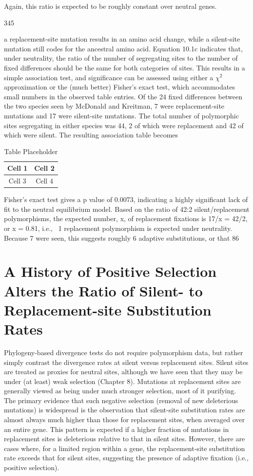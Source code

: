 \documentclass{article}
\begin{document}
Again, this ratio is expected to be roughly constant over neutral genes.

345

a replacement-site mutation results in an amino acid change, while a silent-site mutation still codes for the ancestral amino acid. Equation 10.1c indicates that, under neutrality, the ratio of the number of segregating sites to the number of fixed differences should be the same for both categories of sites. This results in a simple association test, and significance can be assessed using either a  $ \chi^{2} $ approximation or the (much better) Fisher's exact test, which accommodates small numbers in the observed table entries. Of the 24 fixed differences between the two species seen by McDonald and Kreitman, 7 were replacement-site mutations and 17 were silent-site mutations. The total number of polymorphic sites segregating in either species was 44, 2 of which were replacement and 42 of which were silent. The resulting association table becomes

\begin{table}[h]
\centering
\begin{tabular}{|c|c|}
\hline
Cell 1 & Cell 2 \\
\hline
Cell 3 & Cell 4 \\
\hline
\end{tabular}
\caption{Table Placeholder}
\end{table}

Fisher’s exact test gives a p value of 0.0073, indicating a highly significant lack of fit to the neutral equilibrium model. Based on the ratio of 42:2 silent/replacement polymorphisms, the expected number, x, of replacement fixations is 17/x = 42/2, or x = 0.81, i.e., ~1 replacement polymorphism is expected under neutrality. Because 7 were seen, this suggests roughly 6 adaptive substitutions, or that 86%

\section{A History of Positive Selection Alters the Ratio of Silent- to Replacement-site Substitution Rates}
Phylogeny-based divergence tests do not require polymorphism data, but rather simply contrast the divergence rates at silent versus replacement sites. Silent sites are treated as proxies for neutral sites, although we have seen that they may be under (at least) weak selection (Chapter 8). Mutations at replacement sites are generally viewed as being under much stronger selection, most of it purifying. The primary evidence that such negative selection (removal of new deleterious mutations) is widespread is the observation that silent-site substitution rates are almost always much higher than those for replacement sites, when averaged over an entire gene. This pattern is expected if a higher fraction of mutations in replacement sites is deleterious relative to that in silent sites. However, there are cases where, for a limited region within a gene, the replacement-site substitution rate exceeds that for silent sites, suggesting the presence of adaptive fixation (i.e., positive selection).
\end{document}
